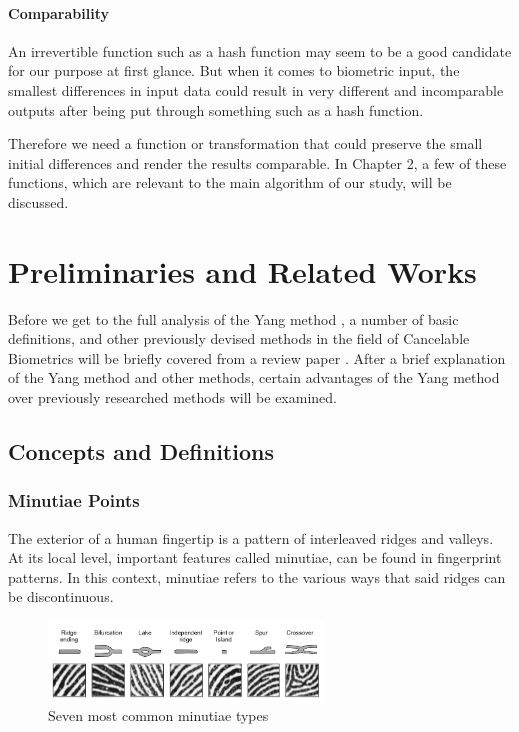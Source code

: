 \documentclass[fyp]{socreport}
\begin{document}
\subsubsection{Comparability}
An irrevertible function such as a hash function may seem to be a good candidate for our purpose at first glance. But when it comes to biometric input, the smallest differences in input data could result in very different and incomparable outputs after being put through something such as a hash function.

Therefore we need a function or transformation that could preserve the small initial differences and render the results comparable. In Chapter 2, a few of these functions, which are relevant to the main algorithm of our study, will be discussed.

\chapter{Preliminaries and Related Works}
Before we get to the full analysis of the Yang method \cite{wencheng18cbio}, a number of basic definitions, and other previously devised methods in the field of Cancelable Biometrics will be briefly covered from a review paper \cite{kumar19cbio}. After a brief explanation of the Yang method and other methods, certain advantages of the Yang method over previously researched methods will be examined.


\section{Concepts and Definitions}
\subsection{Minutiae Points}
The exterior of a human fingertip is a pattern of interleaved ridges and valleys. At its local level, important features called minutiae, can be found in fingerprint patterns. In this context, minutiae refers to the various ways that said ridges can be discontinuous. \cite{maltoni22fing}

\begin{figure}[H]
	\centering
	\includegraphics[width=0.65\textwidth]
	{minutiae_types}
	\caption{Seven most common minutiae types}
\end{figure}
\end{document}
